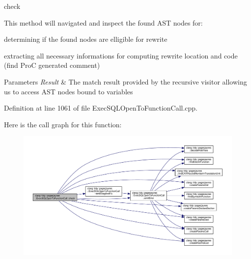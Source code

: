 check

This method will navigated and inspect the found A\+ST nodes for\+:
\begin{DoxyItemize}
\item determining if the found nodes are elligible for rewrite
\item extracting all necessary informations for computing rewrite location and code (find ProC generated comment)
\end{DoxyItemize}


\begin{DoxyParams}{Parameters}
{\em Result} & The match result provided by the recursive visitor allowing us to access A\+ST nodes bound to variables \\
\hline
\end{DoxyParams}


Definition at line 1061 of file Exec\+S\+Q\+L\+Open\+To\+Function\+Call.\+cpp.

Here is the call graph for this function\+:
\nopagebreak
\begin{figure}[H]
\begin{center}
\leavevmode
\includegraphics[width=350pt]{classclang_1_1tidy_1_1pagesjaunes_1_1_exec_s_q_l_open_to_function_call_ad459a073a4ef5dfcba189e46f618902d_cgraph}
\end{center}
\end{figure}
\mbox{\label{classclang_1_1tidy_1_1pagesjaunes_1_1_exec_s_q_l_open_to_function_call_a00b269de2e10d828f3f588911dfc749c}} 
